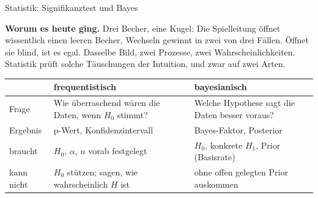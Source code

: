 \begin{handout}{Statistik: Signifikanztest und Bayes}

\textbf{Worum es heute ging.} Drei Becher, eine Kugel: Die Spielleitung
öffnet wissentlich einen leeren Becher, Wechseln gewinnt in zwei von drei
Fällen. Öffnet sie blind, ist es egal. Dasselbe Bild, zwei Prozesse, zwei
Wahrscheinlichkeiten. Statistik prüft solche Täuschungen der Intuition, und
zwar auf zwei Arten.

\begin{center}
\small
\begin{tabular}{@{}p{}p{}p{}@{}}
\toprule
 & \textbf{frequentistisch} & \textbf{bayesianisch} \\
\midrule
Frage & Wie überraschend wären die Daten, wenn $H_0$ stimmt? & Welche Hypothese sagt die Daten besser voraus? \\
Ergebnis & p-Wert, Konfidenzintervall & Bayes-Faktor, Posterior \\
braucht & $H_0$, $\alpha$, $n$ vorab festgelegt & $H_0$, konkrete $H_1$, Prior (Basisrate) \\
kann nicht & $H_0$ stützen; sagen, wie wahrscheinlich $H$ ist & ohne offen gelegten Prior auskommen \\
\bottomrule
\end{tabular}
\end{center}


\end{handout}
